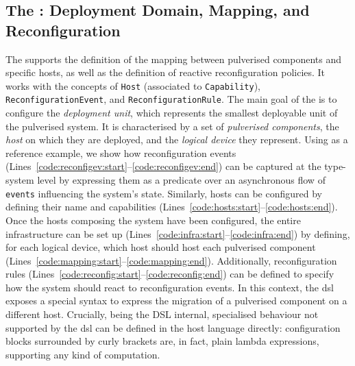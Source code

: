 \documentclass[conference]{IEEEtran}
\newcommand{\meta}[1]{{\color{blue}#1}}
\begin{document}
\subsection{The \dslDep{}: Deployment Domain, Mapping, and Reconfiguration}
\label{sec:contrib:dsldep}

The \dslDep{} supports the definition of the mapping between pulverised components and specific hosts,
as well as the definition of reactive reconfiguration policies.
%
It works with the concepts of \texttt{Host}
(associated to \texttt{Capability}),
\texttt{ReconfigurationEvent},
and \texttt{ReconfigurationRule}.
%
\meta{
The main goal of the \dslDep{} is to configure the \emph{deployment unit},
which represents the smallest deployable unit of the pulverised system.
%
It is characterised by a set of \emph{pulverised components},
the \emph{host} on which they are deployed,
and the \emph{logical device} they represent. 
}
%
Using  as a reference example,
we show how reconfiguration events (Lines~\ref{code:reconfigev:start}--\ref{code:reconfigev:end}) can be captured at the type-system level
by expressing them as a predicate over an asynchronous flow of \texttt{events} influencing the system's state.
%
Similarly, hosts can be configured by defining their name and capabilities (Lines~\ref{code:hosts:start}--\ref{code:hosts:end}).
%
Once the hosts composing the system have been configured,
the entire infrastructure can be set up (Lines~\ref{code:infra:start}--\ref{code:infra:end}) by defining,
for each logical device,
which host should host each pulverised component (Lines~\ref{code:mapping:start}--\ref{code:mapping:end}).
%
Additionally,
reconfiguration rules (Lines~\ref{code:reconfig:start}--\ref{code:reconfig:end}) can be defined to specify how the system should react to reconfiguration events.
%
In this context, the \ac{dsl} exposes a special syntax to express the migration of a pulverised component on a different host.
%
Crucially, being the DSL internal,
specialised behaviour not supported by the \ac{dsl} can be defined in the host language directly:
configuration blocks surrounded by curly brackets are,
in fact,
plain lambda expressions, supporting any kind of computation.

\makeatletter
\newcommand\currentStyle@lstparam{}
\lst@AddToHook{Output}{\global\let\currentStyle@lstparam\lst@thestyle}
\lst@AddToHook{OutputOther}{\global\let\currentStyle@lstparam\lst@thestyle}
\makeatother

\makeatletter
\newcommand{\crefe}[1]{\currentStyle@lstparam\Cref{#1}} %
\makeatother
\end{document}
